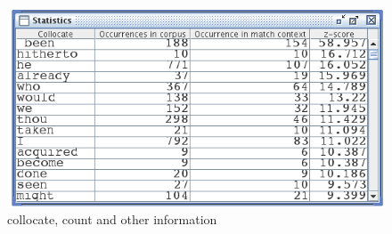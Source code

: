 \begin{figure}[!ht]
\begin{center}
\includegraphics[width=12cm]{resources/img/fig4-12.png}
\caption{collocate, count and other information\label{fig-statistics-mode2}}
\end{center}
\end{figure}

